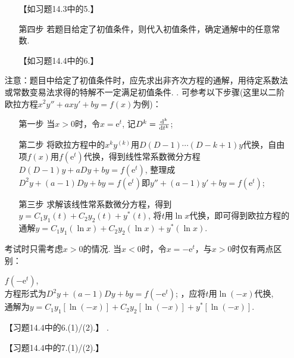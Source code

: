 \documentclass[12pt,UTF8]{ctexart}
\newcommand{\md}[1]{\mathrm d#1}
\newcommand{\me}[0]{\mathrm e}
\begin{document}
\begin{enumerate}
\begin{enumerate}
【如习题14.3中的5.】
\item[第四步]若题目给定了初值条件，则代入初值条件，确定通解中的任意常数.

【如习题14.4中的6.】
\end{enumerate}
注意：题目中给定了初值条件时，应先求出非齐次方程的通解，用待定系数法或常数变易法求得的特解不一定满足初值条件.
. 可参考以下步骤(这里以二阶欧拉方程$x^2y''+axy'+by=f(x)$为例)：
\begin{enumerate}
\item[第一步]当$x>0$时，令$x=\me^t$, 记$D^k=\frac{\md^k}{\md t^k}$;
\item[第二步]将欧拉方程中的$x^ky^{(k)}$用$D(D-1)\cdots(D-k+1)y$代换，自由项$f(x)$用$f(\me^t)$代换，得到线性常系数微分方程$D(D-1)y+aDy+by=f(\me^t)$, 整理成$D^2y+(a-1)Dy+by=f(\me^t)$即$y''+(a-1)y'+by=f(\me^t)$;
\item[第三步]求解该线性常系数微分方程，得到$y=C_1y_1(t)+C_2y_2(t)+y^*(t)$, 将$t$用$\ln x$代换，即可得到欧拉方程的通解$y=C_1y_1(\ln x)+C_2y_2(\ln x)+y^*(\ln x)$.
\end{enumerate}
考试时只需考虑$x>0$的情况. 当$x<0$时，令$x=-\me^t$，与$x>0$时仅有两点区别：
\begin{itemize}
$f(-\me^t)$, \\
方程形式为$D^2y+(a-1)Dy+by=f(-\me^t)$;
，应将$t$用$\ln(-x)$代换, \\
通解为$y=C_1y_1[\ln(-x)]+C_2y_2[\ln(-x)]+y^*[\ln(-x)]$.
\end{itemize}

【习题14.4中的6.(1)/(2).】
.

【习题14.4中的7.(1)/(2).】
\end{enumerate}
\end{document}
